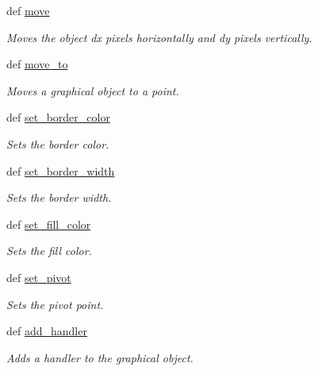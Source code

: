 \begin{DoxyCompactItemize}
def \hyperlink{classcs110graphics_1_1Fillable_ae8f6c476e29c0810453dc16948e1730c}{move}
\begin{DoxyCompactList}\small\item\em Moves the object dx pixels horizontally and dy pixels vertically. \item\end{DoxyCompactList}\item 
def \hyperlink{classcs110graphics_1_1Fillable_adcabc14e76d1160ff591b9ef7f3d6a97}{move\_\-to}
\begin{DoxyCompactList}\small\item\em Moves a graphical object to a point. \item\end{DoxyCompactList}\item 
def \hyperlink{classcs110graphics_1_1Fillable_a2f830be5d970faac97759910d20d68a4}{set\_\-border\_\-color}
\begin{DoxyCompactList}\small\item\em Sets the border color. \item\end{DoxyCompactList}\item 
def \hyperlink{classcs110graphics_1_1Fillable_a09f05462cb2ed38fdccb244340f05b2b}{set\_\-border\_\-width}
\begin{DoxyCompactList}\small\item\em Sets the border width. \item\end{DoxyCompactList}\item 
def \hyperlink{classcs110graphics_1_1Fillable_a4f24c7186c8d057e42a0209eb1d56be7}{set\_\-fill\_\-color}
\begin{DoxyCompactList}\small\item\em Sets the fill color. \item\end{DoxyCompactList}\item 
def \hyperlink{classcs110graphics_1_1Fillable_a2a6066d1a11c0854ff5ee85e7d9ceb54}{set\_\-pivot}
\begin{DoxyCompactList}\small\item\em Sets the pivot point. \item\end{DoxyCompactList}\item 
def \hyperlink{classcs110graphics_1_1GraphicalObject_adb1af0d5a6baae3f9a08d21a3227c49f}{add\_\-handler}
\begin{DoxyCompactList}\small\item\em Adds a handler to the graphical object. \item\end{DoxyCompactList}\item 

\end{DoxyCompactItemize}
